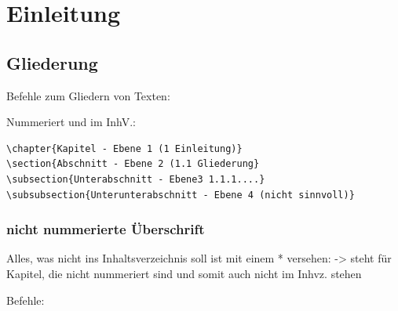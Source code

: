 \documentclass{like}
\begin{document}
  








\setcounter{page}{1}   %
\chapter{Einleitung}
\section{Gliederung}
Befehle zum Gliedern von Texten:\par
Nummeriert und im InhV.:\nopagebreak\par\medskip\nopagebreak

\begin{minipage}{0.4\textwidth}
\begin{verbatim}
\chapter{Kapitel - Ebene 1 (1 Einleitung)}
\section{Abschnitt - Ebene 2 (1.1 Gliederung}
\subsection{Unterabschnitt - Ebene3 1.1.1....} 
\subsubsection{Unterunterabschnitt - Ebene 4 (nicht sinnvoll)}
\end{verbatim}
\end{minipage}


\subsection*{nicht nummerierte Überschrift}
Alles, was nicht ins Inhaltsverzeichnis soll ist mit einem *
 versehen: -> steht für Kapitel, die nicht nummeriert sind und somit auch nicht im Inhvz. stehen\par
Befehle: \par
\end{document}

